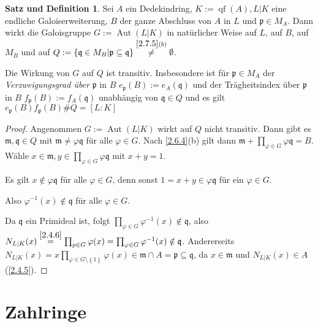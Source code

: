 \documentclass[
twoside=semi,
fontsize=12,
DIV=12, 
cleardoublepage=current,
leqno,
headings=optiontoheadandtoc, 
toc=idx
]{scrbook}
\newcommand{\set}[1]{\left\{ #1 \right\}}
\DeclareMathOperator{\Aut}{Aut}
\DeclareMathOperator{\qf}{qf}
\theoremstyle{definition}
\newtheorem{satz-def}[definition]{Satz und Definition}
\begin{document}
 	\begin{satz-def}\label{2.7.6}
 		Sei $A$ ein Dedekindring, $K:= \qf(A), L|K$ eine endliche Galoiserweiterung, $B$ der ganze Abschluss von $A$ in $L$ und $\mathfrak{p} \in M_A$. Dann wirkt die Galoisgruppe $G:= \Aut(L|K)$ in nat\"urlicher Weise auf $L$, auf $B$, auf $M_B$ und auf $Q:= \set{\mathfrak{q} \in M_B| \mathfrak{p} \subseteq \mathfrak{q}} \overset{\ref{2.7.5}(b)}{\neq} \emptyset$.
 		
 		Die Wirkung von $G$ auf $Q$ ist transitiv. Insbesondere ist f\"ur $\mathfrak{p} \in M_A$ der \emph{Verzweigungsgrad \"uber} $\mathfrak{p}$ in $B$ $e_\mathfrak{p}(B) := e_A(\mathfrak{q})$ und der Tr\"agheitsindex \"uber $\mathfrak{p}$ in $B$ $f_\mathfrak{p}(B) := f_A(\mathfrak{q})$ unabh\"angig von $\mathfrak{q} \in Q$ und es gilt $e_\mathfrak{p}(B)f_\mathfrak{p}(B)\#Q = [L:K]$
 		
 		\begin{proof}
 			Angenommen $G:= \Aut(L|K)$ wirkt auf $Q$ nicht transitiv. Dann gibt es $\mathfrak{m}, \mathfrak{q} \in Q$ mit $\mathfrak{m} \neq \varphi \mathfrak{q}$ f\"ur alle $\varphi \in G$. Nach \ref{2.6.4}(b) gilt dann $\mathfrak{m} + \prod_{\varphi \in G} \varphi \mathfrak{q} = B$. W\"ahle $x \in \mathfrak{m}, y \in \prod_{\varphi \in G} \varphi \mathfrak{q}$  mit $x+y = 1$.
 			
 			Es gilt $x \notin \varphi \mathfrak{q}$ f\"ur alle $\varphi \in G$, denn sonst $1 = x + y \in \varphi \mathfrak{q}$ f\"ur ein $\varphi \in G$.
 			\newline
 			
 			Also $\varphi^{-1}(x) \notin \mathfrak{q}$ f\"ur alle $\varphi \in G$.
 			
 			Da $\mathfrak{q}$ ein Primideal ist, folgt $\prod_{\varphi \in G} \varphi^{-1}(x) \notin \mathfrak{q} $, also $N_{L|K}(x) \overset{\ref{2.4.6}}{=} \prod_{p \in G} \varphi(x) = \prod_{\varphi \in G} \varphi^{-1}(x) \notin \mathfrak{q}$. Andererseits $N_{L|K}(x) = x \prod_{\varphi \in G \setminus \set{1}} \varphi(x) \in \mathfrak{m} \cap A = \mathfrak{p} \subseteq \mathfrak{q}$, da $x \in \mathfrak{m}$ und $N_{L|K}(x) \in A$ (\ref{2.4.5}).
 		\end{proof}
 	\end{satz-def}
 
 	\newpage
 	\chapter[tocentry={Zahlringe}]{Zahlringe}
\end{document}
